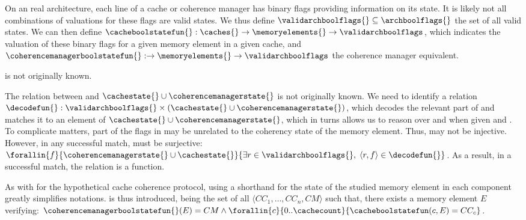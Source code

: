 \begin{definition}
\label{def:identifying:cache_controller_state}
   On an real architecture, each line of a cache or coherence manager has
   \archboolflagscount{} binary flags providing information on its state. It is
   likely not all combinations of valuations for these flags are valid states.
   We thus define $\validarchboolflags{} \subseteq \archboolflags{}$ the set of
   all valid states. We can then define $\cacheboolstatefun{}: \caches{} \to
   \memoryelements{} \to \validarchboolflags$, which indicates the valuation of
   these binary flags for a given memory element in a given cache, and
   $\coherencemanagerboolstatefun{}: \to \memoryelements{} \to
   \validarchboolflags$ the coherence manager equivalent.
\end{definition}

\begin{issue}
\label{issue:catalog_observable_states}
   \validarchboolflags{} is not originally known.
\end{issue}

\begin{issue}
   \label{issue:define_state_decode}
   The relation between \validarchboolflags{} and $\cachestate{} \cup
   \coherencemanagerstate{}$ is not originally known.  We need to identify a
   relation $\decodefun{}: \validarchboolflags{} \times (\cachestate{} \cup
   \coherencemanagerstate{})$, which decodes the relevant part of
   \validarchboolflags{} and matches it to an element of $\cachestate{} \cup
   \coherencemanagerstate{}$, which in turns allows us to reason over
   \cachestatefun{} and \coherencemanagerstatefun{} when given
   \cacheboolstatefun{} and \coherencemanagerboolstatefun{}. To complicate
   matters, part of the flags in \validarchboolflags{} may be unrelated to the
   coherency state of the memory element. Thus, \decodefun{} may not be
   injective.
   However, in any successful match, \decodefun{} must be
   surjective:
$
   \forallin{f}{\coherencemanagerstate{} \cup \cachestate{}}{%
      \exists r \in \validarchboolflags{}, \;
         \langle r, f \rangle \in \decodefun{}
   }%
$.
   As a result, in a successful match, the \decodefun{} relation is a function.
\end{issue}

\begin{definition}
\label{def:identifying:observable_system_state}
   As with \systemstate{} for the hypothetical cache coherence protocol, using a
   shorthand for the state of the studied memory element in each component
   greatly simplifies notations. \obssystemstate{} is thus introduced, being the
   set of all $\langle{}CC_1, \ldots, CC_n, CM\rangle{}$ such that, there exists
   a memory element $E$ verifying:
   $
      \coherencemanagerboolstatefun{}(E) = CM \land
      \forallin{c}{0..\cachecount}{%
         \cacheboolstatefun(c, E) = CC_c
      }
   $.
\end{definition}

